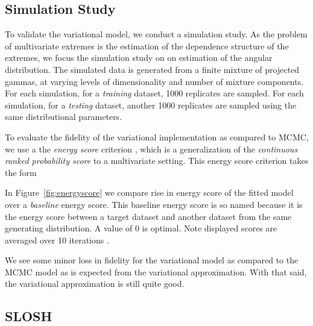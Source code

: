 \subsection{Simulation Study}
To validate the variational model, we conduct a simulation study.
    As the problem of multivariate extremes is the estimation of the dependence
    structure of the extremes, we focus the simulation study on on estimation of
    the angular distribution.  The simulated data is generated from a finite
    mixture of projected gammas, at varying levels of dimensionality and number
    of mixture components.  For each simulation, for a \emph{training} dataset,
    \num{1000} replicates are sampled.  For each simulation, for a 
    \emph{testing} dataset, another \num{1000} replicates are sampled using
    the same distributional parameters.

To evaluate the fidelity of the variational implementation as compared to MCMC, 
    we use a the \emph{energy score} criterion \citep{gneiting2007}, which is a
    generalization of the \emph{continuous ranked probability score} to a
    multivariate setting.  This energy score criterion takes the form
    
    In Figure~\ref{fig:energyscore} we compare rise in energy score of the fitted
    model over a \emph{baseline} energy score.  This baseline energy score is so
    named because it is the energy score between a target dataset and another
    dataset from the same generating distribution.  A value of 0 is optimal.
      Note displayed scores are 
    averaged over 10 iterations .
    
    We see some minor loss in fidelity for the variational model as compared to 
    the MCMC model as is expected from the variational approximation.  With that
    said, the variational approximation is still quite good.

\subsection{SLOSH}
